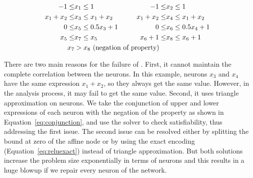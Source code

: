 \begin{equation}
    \begin{aligned}
      -1 \leq & x_1 \leq 1 \hspace*{-1cm}&  \hspace*{-2cm}
      -1 \leq & x_2 \leq 1 \\
         x_1 + x_2 \leq & x_3 \leq x_1 + x_2 \hspace*{-1cm}& \hspace*{-2cm}
         x_1 + x_2 \leq & x_4 \leq x_1 + x_2 \\
         0 \leq & x_5 \leq 0.5x_3+1 \hspace*{-1cm}&  \hspace*{-2cm}
         0 \leq & x_6 \leq 0.5x_4 + 1 \\
         x_5 \leq & x_7 \leq x_5 \hspace*{-1cm}&\hspace*{-2cm}
         x_6+1 \leq & x_8 \leq x_6+1 \\
         x_7 & > x_8 \text{ (negation of property)}&&\\
    \end{aligned}
\label{eq:conjunction}
\end{equation}

There are two main reasons for the failure of \deeppoly{}. First, it cannot maintain the complete correlation 
between the neurons. In this example, neurons $x_3$ and $x_4$ have the same expression $x_1+x_2$, so they always
get the same value. However, in the \deeppoly{} analysis process, it may fail to get the same value. Second, it uses triangle
approximation on \relu{} neurons.
We take the conjunction of upper and lower expressions of each neuron with the negation of the property
as shown in Equation~\ref{eq:conjunction},
 and use the \milp{} solver to check satisfiability, thus addressing the first issue.  
The second issue can be resolved either by splitting the bound at zero of the 
affine node or by using the exact encoding (Equation~\ref{eq:reluexact}) 
instead of triangle approximation. 
But both solutions increase the problem size exponentially in terms of \relu{} neurons and this results in a huge 
blowup if we repair every neuron of the network. 

